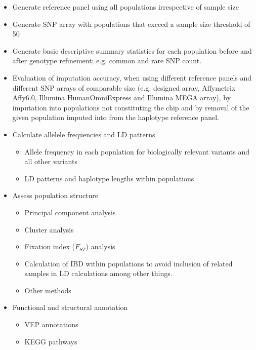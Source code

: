 \begin{itemize}
 \item Generate reference panel using all populations irrespective of sample size
 \item Generate SNP array with populations that exceed a sample size threshold of 50
 \item Generate basic descriptive summary statistics for each population before and after genotype refinement; e.g. common and rare SNP count.
 \item Evaluation of imputation accuracy, when using different reference panels and different SNP arrays of comparable size (e.g. designed array, Affymetrix Affy6.0, Illumina HumanOmniExpress and Illumina MEGA array), by imputation into populations not constituting the chip and by removal of the given population imputed into from the haplotype reference panel.
 \item Calculate allelele frequencies and LD patterns
 \begin{itemize}
  \item Allele frequency in each population for biologically relevant variants and all other variants
  \item LD patterns and haplotype lengths within populations
 \end{itemize}
 \item Assess population structure
 \begin{itemize}
  \item Principal component analysis
  \item Cluster analysis
  \item {Fixation index ($F_{ST}$) analysis
  }
  \item Calculation of IBD within populations to avoid inclusion of related samples in LD calculations among other things.
  \item Other methods
 \end{itemize}
 \item Functional and structural annotation
  \begin{itemize}
   \item{VEP annotations}
   \item{KEGG pathways}

\end{itemize}
\end{itemize}
